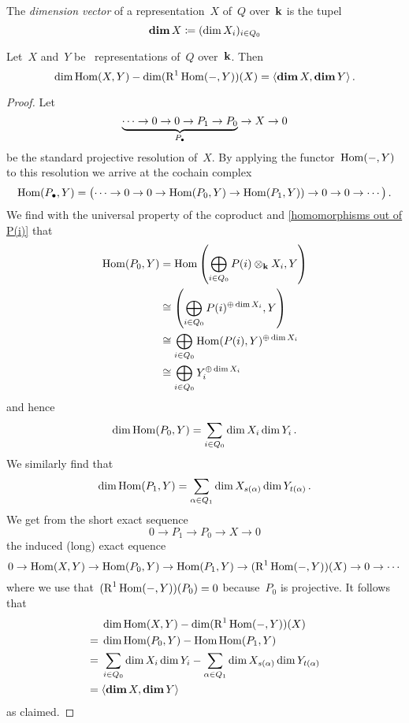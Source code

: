 \begin{definition}
  The \emph{dimension vector} of a {\fd} representation~$X$ of~$Q$ over~$\mathbf{k}$ is the tupel
  \[
    \mathop{\mathbf{dim}} X
    \coloneqq
    (\dim X_i)_{i \in Q_0}
  \]

\end{definition}


\begin{corollary}
  Let~$X$ and~$Y$ be~{\fd} representations of~$Q$ over~$\mathbf{k}$.
  Then
  \[
    \dim \operatorname{Hom}(X,Y)
    -
    \dim (\operatorname{R}^1 \operatorname{Hom}(-,Y))(X)
    =
    \langle\mathop{\mathbf{dim}} X, \mathop{\mathbf{dim}} Y\rangle  \,.
  \]
\end{corollary}


\begin{proof}
  Let
  \[
    \underbrace{
    \dotsb
    \to
    0
    \to
    0
    \to
    P_1
    \to
    P_0
    }_{P_\bullet}
    \to
    X
    \to
    0
  \]
  be the standard projective resolution of~$X$.
  By applying the functor~$\operatorname{Hom}(-,Y)$ to this resolution we arrive at the cochain complex
  \[
    \operatorname{Hom}(P_\bullet, Y)
    =
    \bigl(
      \dotsb
      \to
      0
      \to
      0
      \to
      \operatorname{Hom}(P_0, Y)
      \to
      \operatorname{Hom}(P_1, Y))
      \to
      0
      \to
      0
      \to
      \dotsb
    \bigr)  \,.
  \]
  We find with the universal property of the coproduct and \cref{homomorphisms out of P(i)} that
  \begin{align*}
    \operatorname{Hom}(P_0, Y)
    &=
    \operatorname{Hom}
    \left(
      \bigoplus_{i \in Q_0}
      P(i) \otimes_{\mathbf{k}} X_i,
      Y
    \right)
    \\
    &\cong
    \left(
      \bigoplus_{i \in Q_0}
      P(i)^{\oplus \dim X_i},
      Y
    \right)
    \\
    &\cong
    \bigoplus_{i \in Q_0}
    \operatorname{Hom}( P(i), Y )^{\oplus \dim X_i}
    \\
    &\cong
    \bigoplus_{i \in Q_0}
    Y_i^{\oplus \dim X_i}
  \end{align*}
  and hence
  \[
    \dim \operatorname{Hom}(P_0, Y)
    =
    \sum_{i \in Q_0} \dim X_i \dim Y_i  \,.
  \]
  We similarly find that
  \[
    \dim \operatorname{Hom}(P_1, Y)
    =
    \sum_{\alpha \in Q_1}
    \dim X_{s(\alpha)} \dim Y_{t(\alpha)} \,.
  \]
  We get from the short exact sequence
  \[
    0
    \to
    P_1
    \to
    P_0
    \to
    X
    \to
    0
  \]
  the induced (long) exact equence
  \[
    0
    \to
    \operatorname{Hom}(X,Y)
    \to
    \operatorname{Hom}(P_0,Y)
    \to
    \operatorname{Hom}(P_1,Y)
    \to
    (\operatorname{R}^1 \operatorname{Hom}(-,Y))(X)
    \to
    0
    \to
    \dotsb
  \]
  where we use that~$(\operatorname{R}^1 \operatorname{Hom}(-,Y))(P_0) = 0$ because~$P_0$ is projective.
  It follows that
  \begin{align*}
    {}&
      \dim \operatorname{Hom}(X,Y)
    - \dim (\operatorname{R}^1 \operatorname{Hom}(-,Y))(X)
    \\
    ={}&
      \dim \operatorname{Hom}(P_0, Y)
    - \operatorname{Hom} \operatorname{Hom}(P_1, Y)
    \\
    ={}&
      \sum_{i \in Q_0} \dim X_i \dim Y_i
    - \sum_{\alpha \in Q_1} \dim X_{s(\alpha)} \dim Y_{t(\alpha)}
    \\
    ={}&
      \langle \mathop{\mathbf{dim}} X, \mathop{\mathbf{dim}} Y \rangle
  \end{align*}
  as claimed.
\end{proof}





